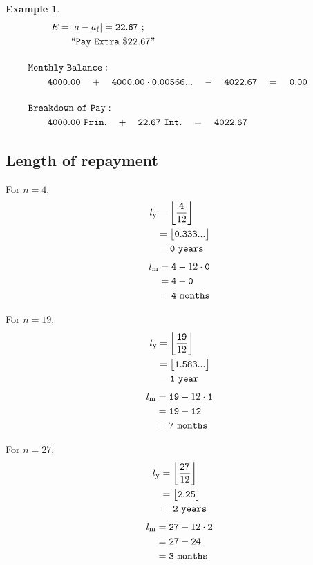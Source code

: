 \documentclass[12pt,letterpaper,oneside]{article}
\newtheorem{example}{Example}[section]
\theoremstyle{remark} %
\begin{document}
\begin{example}
\begin{align*}
	E&=\left|a-a_{\rm{f}}\right|=\mathtt{22.67}\ ;\\
	&\quad\;\mathtt{``Pay\ Extra\ \$22.67"}\\[12pt]
	&\!\!\!\!\!\!\!\!\!\!\!\!\!\!\!\!\!\!\!\mathtt{Monthly\ Balance:}\\
	&\!\!\!\!\!\!\!\mathtt{4000.00}\quad +\quad\mathtt{4000.00}\cdot \mathtt{\rate}\quad -\quad \mathtt{4022.67}\quad =\quad \mathtt{0.00}\\[12pt]
	&\!\!\!\!\!\!\!\!\!\!\!\!\!\!\!\!\!\!\!\mathtt{Breakdown\ of\ Pay:}\\
	&\!\!\!\!\!\!\!\mathtt{4000.00\ Prin.}\quad +\quad\mathtt{22.67\ Int.}\quad =\quad\mathtt{4022.67}
	\end{align*}
	\end{example}

	\normalsize
	\newpage
	\subsection{Length of repayment}
	For $n=4$,
	\begin{align*}
	l_{\rm{y}}&=\bigg\lfloor{\frac{\mathtt{4}}{12}}\bigg\rfloor\\
	&=\big\lfloor{\mathtt{0.333...}}\big\rfloor\\
	&=\mathtt{0\ years}
	\end{align*}
	\begin{align*}
	l_{\rm{m}}&=\mathtt{4}-12\cdot \mathtt{0}\\
	&=\mathtt{4}-\mathtt{0}\\
	&=\mathtt{4\ months}
	\end{align*}

	For $n=19$,
	\begin{align*}
	l_{\rm{y}}&=\bigg\lfloor{\frac{\mathtt{19}}{12}}\bigg\rfloor\\
	&=\big\lfloor{\mathtt{1.583...}}\big\rfloor\\
	&=\mathtt{1\ year}
	\end{align*}
	\begin{align*}
	l_{\rm{m}}&=\mathtt{19}-12\cdot \mathtt{1}\\
	&=\mathtt{19}-\mathtt{12}\\
	&=\mathtt{7\ months}
	\end{align*}

	For $n=27$,
	\begin{align*}
	l_{\rm{y}}&=\bigg\lfloor{\frac{\mathtt{27}}{12}}\bigg\rfloor\\
	&=\big\lfloor{\mathtt{2.25}}\big\rfloor\\
	&=\mathtt{2\ years}
	\end{align*}
	\begin{align*}
	l_{\rm{m}}&=\mathtt{27}-12\cdot \mathtt{2}\\
	&=\mathtt{27}-\mathtt{24}\\
	&=\mathtt{3\ months}
	\end{align*}
\end{document}
